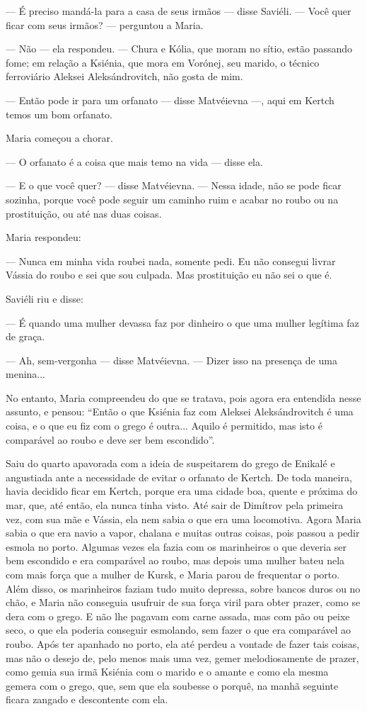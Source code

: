 --- É preciso mandá-la para a casa de seus irmãos --- disse Saviéli. ---
Você quer ficar com seus irmãos? --- perguntou a Maria.

--- Não --- ela respondeu. --- Chura e Kólia, que moram no sítio, estão
passando fome; em relação a Ksiénia, que mora em Vorónej, seu marido, o
técnico ferroviário Aleksei Aleksándrovitch, não gosta de mim.

--- Então pode ir para um orfanato --- disse Matvéievna ---, aqui em
Kertch temos um bom orfanato.

Maria começou a chorar.

--- O orfanato é a coisa que mais temo na vida --- disse ela.

--- E o que você quer? --- disse Matvéievna. --- Nessa idade, não se
pode ficar sozinha, porque você pode seguir um caminho ruim e acabar no
roubo ou na prostituição, ou até nas duas coisas.

Maria respondeu:

--- Nunca em minha vida roubei nada, somente pedi. Eu não consegui
livrar Vássia do roubo e sei que sou culpada. Mas prostituição eu não
sei o que é.

Saviéli riu e disse:

--- É quando uma mulher devassa faz por dinheiro o que uma mulher
legítima faz de graça.

--- Ah, sem-vergonha --- disse Matvéievna. --- Dizer isso na presença de
uma menina...

No entanto, Maria compreendeu do que se tratava, pois agora era
entendida nesse assunto, e pensou: ``Então o que Ksiénia faz com Aleksei
Aleksándrovitch é uma coisa, e o que eu fiz com o grego é outra...
Aquilo é permitido, mas isto é comparável ao roubo e deve ser bem
escondido''.

Saiu do quarto apavorada com a ideia de suspeitarem do grego de Enikalé
e angustiada ante a necessidade de evitar o orfanato de Kertch. De toda
maneira, havia decidido ficar em Kertch, porque era uma cidade boa,
quente e próxima do mar, que, até então, ela nunca tinha visto. Até sair
de Dimítrov pela primeira vez, com sua mãe e Vássia, ela nem sabia o que
era uma locomotiva. Agora Maria sabia o que era navio a vapor, chalana e
muitas outras coisas, pois passou a pedir esmola no porto. Algumas vezes
ela fazia com os marinheiros o que deveria ser bem escondido e era
comparável ao roubo, mas depois uma mulher bateu nela com mais força que
a mulher de Kursk, e Maria parou de frequentar o porto. Além disso, os
marinheiros faziam tudo muito depressa, sobre bancos duros ou no chão, e
Maria não conseguia usufruir de sua força viril para obter prazer, como
se dera com o grego. E não lhe pagavam com carne assada, mas com pão ou
peixe seco, o que ela poderia conseguir esmolando, sem fazer o que era
comparável ao roubo. Após ter apanhado no porto, ela até perdeu a
vontade de fazer tais coisas, mas não o desejo de, pelo menos mais uma
vez, gemer melodiosamente de prazer, como gemia sua irmã Ksiénia com o
marido e o amante e como ela mesma gemera com o grego, que, sem que ela
soubesse o porquê, na manhã seguinte ficara zangado e descontente com
ela.

